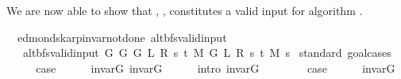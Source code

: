 \begin{isabellebody}
\endisatagproof
{\isafoldproof}%
%
\isadelimproof
%
\endisadelimproof
%
\begin{isamarkuptext}%
We are now able to show that , ,  constitutes
a valid input for algorithm .%
\end{isamarkuptext}\isamarkuptrue%
\isamarkupfalse%
\ {\isacharparenleft}{\kern0pt}\ edmonds{\isacharunderscore}{\kern0pt}karp{\isacharunderscore}{\kern0pt}invar{\isacharunderscore}{\kern0pt}not{\isacharunderscore}{\kern0pt}done{\isacharunderscore}{\kern0pt}{}{\isacharparenright}{\kern0pt}\ alt{\isacharunderscore}{\kern0pt}bfs{\isacharunderscore}{\kern0pt}valid{\isacharunderscore}{\kern0pt}input{\isacharcolon}{\kern0pt}\isanewline
\ \ \ {\isachardoublequoteopen}alt{\isacharunderscore}{\kern0pt}bfs{\isacharunderscore}{\kern0pt}valid{\isacharunderscore}{\kern0pt}input{\isacharprime}{\kern0pt}\ {\isacharparenleft}{\kern0pt}G{}\ G\ {\isacharparenleft}{\kern0pt}G{}\ L\ R\ s\ t\ M{\isacharparenright}{\kern0pt}{\isacharparenright}{\kern0pt}\ {\isacharparenleft}{\kern0pt}G{}\ L\ R\ s\ t\ M{\isacharparenright}{\kern0pt}\ s{\isachardoublequoteclose}\isanewline
%
\isadelimproof
%
\endisadelimproof
%
\isatagproof
{}\isamarkupfalse%
\ {\isacharparenleft}{\kern0pt}standard{\isacharcomma}{\kern0pt}\ goal{\isacharunderscore}{\kern0pt}cases{\isacharparenright}{\kern0pt}\isanewline
\ \ \isamarkupfalse%
\ {}\isanewline
\ \ \isamarkupfalse%
\ {\isacharquery}{\kern0pt}case\isanewline
\ \ \ \ \isamarkupfalse%
\ invar{\isacharunderscore}{\kern0pt}G\ invar{\isacharunderscore}{\kern0pt}G{}\isanewline
\ \ \ \ \isamarkupfalse%
\ {\isacharparenleft}{\kern0pt}intro\ invar{\isacharunderscore}{\kern0pt}G{}{\isacharparenright}{\kern0pt}\isanewline
{}\isamarkupfalse%
\isanewline
\ \ \isamarkupfalse%
\ {}\isanewline
\ \ \isamarkupfalse%
\ {\isacharquery}{\kern0pt}case\isanewline
\ \ \ \ \isamarkupfalse%
\ invar{\isacharunderscore}{\kern0pt}G{}\isanewline
\ \ \ \ \isacommand{{\isachardot}{\kern0pt}}\isamarkupfalse%
\isanewline
{}\isamarkupfalse%
\isanewline

\end{isabellebody}
